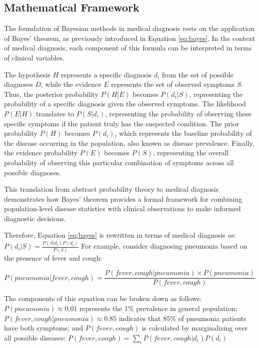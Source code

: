 \documentclass[3p,times,procedia]{elsarticle}
\begin{document}
\subsection{Mathematical Framework}
The foundation of Bayesian methods in medical diagnosis rests on the application
of Bayes' theorem, as previously introduced in Equation \ref{eq:bayes}. In the
context of medical diagnosis, each component of this formula can be interpreted in
terms of clinical variables.

The hypothesis $H$ represents a specific diagnosis $d_i$ from the set of possible
diagnoses $D$, while the evidence $E$ represents the set of observed symptoms $S$.
Thus, the posterior probability $P(H|E)$ becomes $P(d_i|S)$, representing the probability
of a specific diagnosis given the observed symptoms. The likelihood $P(E|H)$ translates
to $P(S|d_i)$, representing the probability of observing these specific symptoms if
the patient truly has the suspected condition. The prior probability $P(H)$ becomes
$P(d_i)$, which represents the baseline probability of the disease occurring in the
population, also known as disease prevalence. Finally, the evidence probability $P(E)$
becomes $P(S)$, representing the overall probability of observing this particular
combination of symptoms across all possible diagnoses.

This translation from abstract probability theory to medical diagnosis demonstrates
how Bayes' theorem provides a formal framework for combining population-level disease
statistics with clinical observations to make informed diagnostic decisions.

Therefore, Equation \ref{eq:bayes} is rewritten in terms of medical diagnosis as:
$P(d_i|S) = \frac{P(S|d_i)P(d_i)}{P(S)}$
For example, consider diagnosing pneumonia based on the presence of fever and cough:

\begin{equation*}
P(pneumonia|fever,cough) = \frac{P(fever,cough|pneumonia) \times P(pneumonia)}{P(fever,cough)}
\end{equation*}

The components of this equation can be broken down as follows:
$P(pneumonia) \approx 0.01$ represents the 1\% prevalence in general population;
$P(fever,cough|pneumonia) \approx 0.85$ indicates that 85\% of pneumonia patients have both symptoms;
and $P(fever,cough)$ is calculated by marginalizing over all possible diseases:
$P(fever,cough) = \sum_i P(fever,cough|d_i)P(d_i)$
\end{document}
